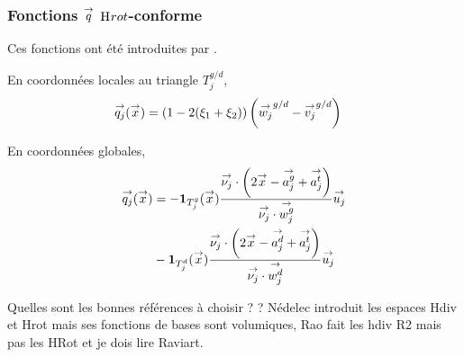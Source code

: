     \subsubsection[Fonctions q Hcurl-conforme]{Fonctions \(\vect{q}\) \(\Hrot\)-conforme}

      Ces fonctions ont été introduites par \cite[eq.~28]{bendali_boundary-element_1999}.

      \begin{minipage}{0.45\textwidth}
        \begin{center}
          \begin{tikzpicture}[scale=1]
            
          \end{tikzpicture}
        \end{center}
          \label{fig:form_int:fon_base:q}
      \end{minipage} 
      \begin{minipage}{0.54\textwidth}
        En coordonnées locales au triangle \(T_j^{g/d}\),
        \begin{align*}
          \qj(\vx) &= \left(1-2(\xi_1+\xi_2)\right)\left(\vect{w_j}^{g/d} - \vect{v_j}^{g/d} \right)
        \end{align*}

        En coordonnées globales,
        \begin{align*}
          \qj(\vx) 
          &= - \mathbf{1}_{T_j^g}(\vx) \frac{\nuj\cdot\left(2\vx - {\vect{a_j^g} + \vect{a_j^t}}\right)}{\nuj\cdot \vect{w_j^g}} \uj \\
          &- \mathbf{1}_{T_j^d}(\vx) \frac{\nuj\cdot\left(2\vx - {\vect{a_j^d} + \vect{a_j^t}}\right)}{\nuj\cdot\vect{w_j^d}}\uj
        \end{align*}
      \end{minipage}

    \begin{REF}
      Quelles sont les bonnes références à choisir ? \cite{raviart_mixed_1977,nedelec_mixed_1980,rao_electromagnetic_1982} ? Nédelec introduit les espaces Hdiv et Hrot mais ses fonctions de bases sont volumiques, Rao fait les hdiv R2 mais pas les HRot et je dois lire Raviart.
    \end{REF}


